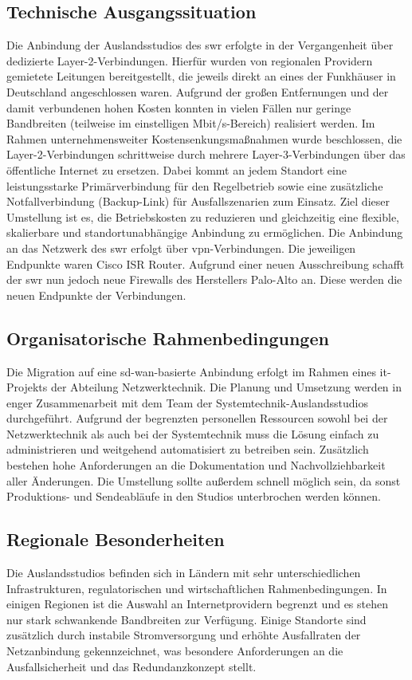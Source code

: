 
\subsection*{Technische Ausgangssituation}
Die Anbindung der Auslandsstudios des \ac{swr} erfolgte in der Vergangenheit über dedizierte Layer-2-Verbindungen. Hierfür wurden von regionalen Providern gemietete Leitungen bereitgestellt, die jeweils direkt an eines der Funkhäuser in Deutschland angeschlossen waren. Aufgrund der großen Entfernungen und der damit verbundenen hohen Kosten konnten in vielen Fällen nur geringe Bandbreiten (teilweise im einstelligen Mbit/s-Bereich) realisiert werden.
Im Rahmen unternehmensweiter Kostensenkungsmaßnahmen wurde beschlossen, die Layer-2-Verbindungen schrittweise durch mehrere Layer-3-Verbindungen über das öffentliche Internet zu ersetzen. Dabei kommt an jedem Standort eine leistungsstarke Primärverbindung für den Regelbetrieb sowie eine zusätzliche Notfallverbindung (Backup-Link) für Ausfallszenarien zum Einsatz. Ziel dieser Umstellung ist es, die Betriebskosten zu reduzieren und gleichzeitig eine flexible, skalierbare und standortunabhängige Anbindung zu ermöglichen. Die Anbindung an das Netzwerk des \ac{swr} erfolgt über \ac{vpn}-Verbindungen. 
Die jeweiligen Endpunkte waren Cisco ISR Router. Aufgrund einer neuen Ausschreibung schafft der \ac{swr} nun jedoch neue Firewalls des Herstellers Palo-Alto an. Diese werden die neuen Endpunkte der Verbindungen.

\subsection*{Organisatorische Rahmenbedingungen}
Die Migration auf eine \ac{sd-wan}-basierte Anbindung erfolgt im Rahmen eines \ac{it}-Projekts der Abteilung Netzwerktechnik. Die Planung und Umsetzung werden in enger Zusammenarbeit mit dem Team der Systemtechnik-Auslandsstudios durchgeführt. Aufgrund der begrenzten personellen Ressourcen sowohl bei der Netzwerktechnik als auch bei der Systemtechnik muss die Lösung einfach zu administrieren und weitgehend automatisiert zu betreiben sein. Zusätzlich bestehen hohe Anforderungen an die Dokumentation und Nachvollziehbarkeit aller Änderungen. Die Umstellung sollte außerdem schnell möglich sein, da sonst Produktions- und Sendeabläufe in den Studios unterbrochen werden können.

\subsection*{Regionale Besonderheiten}
Die Auslandsstudios befinden sich in Ländern mit sehr unterschiedlichen Infrastrukturen, regulatorischen und wirtschaftlichen Rahmenbedingungen. In einigen Regionen ist die Auswahl an Internetprovidern begrenzt und es stehen nur stark schwankende Bandbreiten zur Verfügung. Einige Standorte sind zusätzlich durch instabile Stromversorgung und erhöhte Ausfallraten der Netzanbindung gekennzeichnet, was besondere Anforderungen an die Ausfallsicherheit und das Redundanzkonzept stellt.